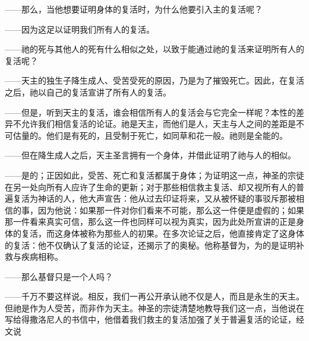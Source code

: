 ——那么，当他想要证明身体的复活时，为什么他要引入主的复活呢？\par

——因为这足以证明我们所有人的复活。\par

——祂的死与其他人的死有什么相似之处，以致于能通过祂的复活来证明所有人的复活呢？\par

——天主的独生子降生成人、受苦受死的原因，乃是为了摧毁死亡。因此，在复活之后，祂以自己的复活宣讲了所有人的复活。\par

——但是，听到天主的复活，谁会相信所有人的复活会与它完全一样呢？本性的差异不允许我们相信复活的论证。祂是天主，而他们是人，天主与人之间的差距是不可估量的。他们是有死的，且受制于死亡，如同草和花一般。祂则是全能的。\par

——但在降生成人之后，天主圣言拥有一个身体，并借此证明了祂与人的相似。\par

——是的；正因如此，受苦、死亡和复活都属于身体；为证明这一点，神圣的宗徒在另一处向所有人应许了生命的更新；对于那些相信救主复活、却又视所有人的普遍复活为神话的人，他大声宣告：他从过去印证将来，又从被怀疑的事驳斥那被相信的事，因为他说：如果那一件对你们看来不可能，那么这一件便是虚假的；如果那一件看来真实可信，那么这一件也同样可以视为真实，因为此处所宣讲的正是身体的复活，而这身体被称为那些人的初果。在多次论证之后，他直接肯定了这身体的复活：他不仅确认了复活的论证，还揭示了的奥秘。他称基督为，为的是证明补救与疾病相称。\par

——那么基督只是一个人吗？\par

——千万不要这样说。相反，我们一再公开承认祂不仅是人，而且是永生的天主。但祂是作为人受苦，而非作为天主。神圣的宗徒清楚地教导我们这一点，当他说在写给得撒洛尼人的书信中，他借着我们救主的复活加强了关于普遍复活的论证，经文说\par

